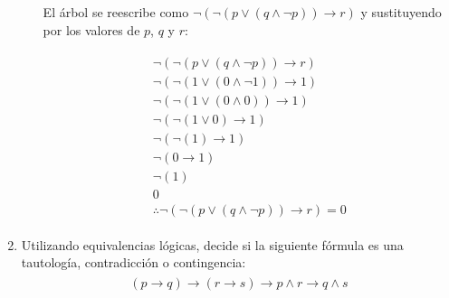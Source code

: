 \documentclass[11pt,letterpaper]{article}
\begin{document}
\begin{enumerate}
\begin{enumerate}
        El árbol se reescribe como $\neg (\neg (p \lor (q \land \neg p)) \to r)$
        y sustituyendo por los valores de $p$, $q$ y $r$:

            \begin{equation}
            \begin{split}
            \begin{aligned}
                \neg (\neg (p \lor (q \land \neg p)) \to r) \\
                \neg (\neg (1 \lor (0 \land \neg 1)) \to 1) \\
                \neg (\neg (1 \lor (0 \land 0)) \to 1) \\
                \neg (\neg (1 \lor 0) \to 1) \\
                \neg (\neg (1) \to 1) \\
                \neg (0 \to 1) \\
                \neg (1) \\
                0 \\
                \therefore \neg (\neg (p \lor (q \land \neg p)) \to r) = 0
            \end{aligned}
            \end{split}
            \end{equation}
    \end{enumerate}

    \clearpage

    \item Utilizando equivalencias lógicas, decide si la siguiente fórmula es
    una tautología, contradicción o contingencia:
        \begin{equation}
        \begin{split}
        \begin{aligned}
            (p \to q) \to (r \to s) \to p \land r \to q \land s
        \end{aligned}
        \end{split}
        \end{equation}


\end{enumerate}
\end{document}
